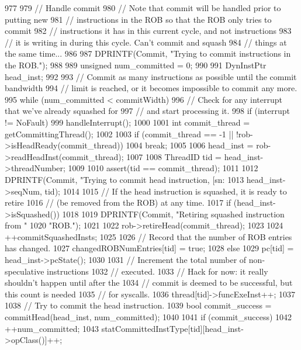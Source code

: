 \begin{DoxyCode}
977 {
979     // Handle commit
980     // Note that commit will be handled prior to putting new
981     // instructions in the ROB so that the ROB only tries to commit
982     // instructions it has in this current cycle, and not instructions
983     // it is writing in during this cycle.  Can't commit and squash
984     // things at the same time...
986 
987     DPRINTF(Commit, "Trying to commit instructions in the ROB.\n");
988 
989     unsigned num_committed = 0;
990 
991     DynInstPtr head_inst;
992 
993     // Commit as many instructions as possible until the commit bandwidth
994     // limit is reached, or it becomes impossible to commit any more.
995     while (num_committed < commitWidth) {
996         // Check for any interrupt that we've already squashed for
997         // and start processing it.
998         if (interrupt != NoFault)
999             handleInterrupt();
1000 
1001         int commit_thread = getCommittingThread();
1002 
1003         if (commit_thread == -1 || !rob->isHeadReady(commit_thread))
1004             break;
1005 
1006         head_inst = rob->readHeadInst(commit_thread);
1007 
1008         ThreadID tid = head_inst->threadNumber;
1009 
1010         assert(tid == commit_thread);
1011 
1012         DPRINTF(Commit, "Trying to commit head instruction, [sn:%
1013                 head_inst->seqNum, tid);
1014 
1015         // If the head instruction is squashed, it is ready to retire
1016         // (be removed from the ROB) at any time.
1017         if (head_inst->isSquashed()) {
1018 
1019             DPRINTF(Commit, "Retiring squashed instruction from "
1020                     "ROB.\n");
1021 
1022             rob->retireHead(commit_thread);
1023 
1024             ++commitSquashedInsts;
1025 
1026             // Record that the number of ROB entries has changed.
1027             changedROBNumEntries[tid] = true;
1028         } else {
1029             pc[tid] = head_inst->pcState();
1030 
1031             // Increment the total number of non-speculative instructions
1032             // executed.
1033             // Hack for now: it really shouldn't happen until after the
1034             // commit is deemed to be successful, but this count is needed
1035             // for syscalls.
1036             thread[tid]->funcExeInst++;
1037 
1038             // Try to commit the head instruction.
1039             bool commit_success = commitHead(head_inst, num_committed);
1040 
1041             if (commit_success) {
1042                 ++num_committed;
1043                 statCommittedInstType[tid][head_inst->opClass()]++;
}}}}
\end{DoxyCode}
